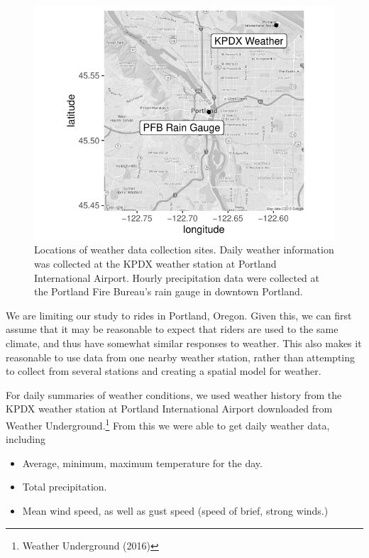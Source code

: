 \documentclass[12pt,twoside]{reedthesis}
\providecommand{\tightlist}{%
  \setlength{\itemsep}{0pt}\setlength{\parskip}{0pt}}
\begin{document}
  \begin{figure}[tbh]
  \centering
  \includegraphics[angle = 0,scale = 1]{figure/weather_station_map.pdf}
  \caption[Locations of weather data collection sites]{\normalsize{Locations of weather data collection sites. Daily weather information
  was collected at the KPDX weather station at Portland International Airport. 
  Hourly precipitation data were collected at the Portland Fire Bureau's rain
  gauge in downtown Portland.}}
  \label{fig:weather-stations}
  \end{figure}
  
  We are limiting our study to rides in Portland, Oregon. Given this, we
  can first assume that it may be reasonable to expect that riders are
  used to the same climate, and thus have somewhat similar responses to
  weather. This also makes it reasonable to use data from one nearby
  weather station, rather than attempting to collect from several stations
  and creating a spatial model for weather.
  
  For daily summaries of weather conditions, we used weather history from
  the KPDX weather station at Portland International Airport downloaded
  from Weather Underground.\footnote{Weather Underground (2016)} From this
  we were able to get daily weather data, including
  
  \begin{itemize}
  \tightlist
  \item
    Average, minimum, maximum temperature for the day.
  \item
    Total precipitation.
  \item
    Mean wind speed, as well as gust speed (speed of brief, strong winds.)
  \end{itemize}
  
\end{document}
